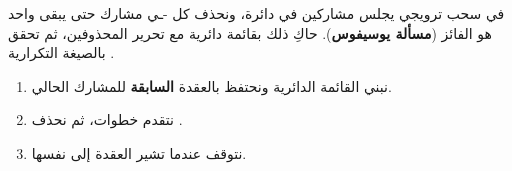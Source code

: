 \begin{statement}
في سحب ترويجي يجلس  مشاركين في دائرة، ونحذف كل -ـي مشارك حتى يبقى واحد هو الفائز (\textbf{مسألة يوسيفوس}). حاكِ ذلك بقائمة دائرية مع تحرير المحذوفين، ثم تحقق بالصيغة التكرارية .
\end{statement}
\begin{stepsbox}\begin{enumerate}
\item نبني القائمة الدائرية ونحتفظ بالعقدة \textbf{السابقة} للمشارك الحالي.
\item نتقدم  خطوات، ثم نحذف .
\item نتوقف عندما تشير العقدة إلى نفسها.
\end{enumerate}\end{stepsbox}
